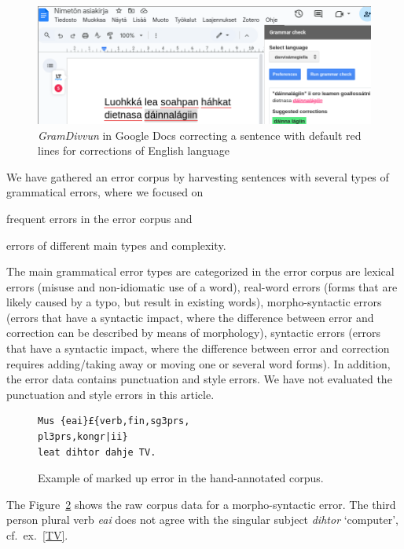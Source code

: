 \documentclass[free]{flammie}
\begin{document}
\begin{figure}
    \includegraphics[width=\textwidth]{gramdivvun.png}
    \caption{\textit{GramDivvun} in Google Docs correcting a
    sentence with default red lines for corrections of English
    language\label{fig:gramdivvun}}
\end{figure}


We have gathered an error corpus by harvesting sentences with several types of
grammatical errors, where we focused on
\begin{enumerate*}
    \item frequent errors in the error corpus
and
    \item errors of different main types and complexity.
\end{enumerate*}
The main grammatical error
types are categorized in the error corpus are lexical
errors (misuse and non-idiomatic use of a word), real-word errors (forms that are
likely caused by a typo, but result in existing words), morpho-syntactic errors
(errors that have a syntactic impact, where the difference between error and
correction can be described by means of morphology), syntactic errors (errors
that have a syntactic impact, where the difference between error and correction
requires adding/taking away or moving one or several word forms). In addition,
the error data contains punctuation and style errors. We have not evaluated the
punctuation and style errors in this article.


\begin{figure}
    \begin{tcolorbox}[colframe=black, colback=white]
    \begin{verbatim}
Mus {eai}£{verb,fin,sg3prs,
pl3prs,kongr|ii}
leat dihtor dahje TV.
    \end{verbatim}
    \end{tcolorbox}
    \caption{Example of marked up error in the hand-annotated
    corpus.\label{markup}}
\end{figure}

The Figure~\ref{markup} shows the raw corpus data for a morpho-syntactic error.
The third person plural verb \textit{eai} does not agree with the singular
subject \textit{dihtor} `computer', cf.\ ex.~\ref{TV}.
\end{document}
